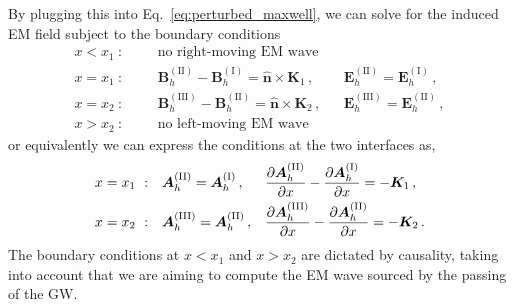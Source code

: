 \documentclass[a4paper,11pt]{article}
\begin{document}
By plugging this into Eq.~\eqref{eq:perturbed_maxwell}, we can solve for the induced EM field subject to the boundary conditions
%
\begin{equation}
    \begin{aligned}
   x < x_1 ~ : && & \text{no right-moving EM wave}   \\
   x= x_1 ~ :  && & {\bm B}_{h}^{(\text{II})} - {\bm B}_{h}^{(\text{I})} =  \hat{\bm{n}} \times {\bm K}_{1}    \, ,
&&
    {\bm E}_{h}^{(\text{II})} =  {\bm E}_{h}^{(\text{I})} \, ,  \\
 x= x_2 ~ :   &&  & {\bm B}_{h}^{(\text{III})} - {\bm B}_{h}^{(\text{II})} = \hat{\bm{n}} \times {\bm K}_{2}
 \, , &&
     {\bm E}_{h}^{(\text{III})} =  {\bm E}_{h}^{(\text{II})} \, ,   \\
      x > x_2 ~ : && & \text{no left-moving EM wave}
    \label{eq:boundary2}
\end{aligned}
\end{equation}
%
or equivalently we can express the conditions at the two interfaces as,
%
\begin{equation}
\begin{aligned}
   x=x_1 ~ : &&  & {\bm A}_{h}^{\rm (II)}   =  {\bm A}_{h}^{\rm (I)}  \,,  && 
   \frac{ \partial {\bm A}_{h}^{(\text{II})}}{\partial x} - \frac{\partial {\bm A}_{h}^{(\text{I})}}{\partial x} = - {\bm K}_{1} \,,
  \\
  x=x_2 ~ : &&  & {\bm A}_{h}^{\rm (III)}   = {\bm A}_{h}^{\rm (II)}   \,,
    &&
    \frac{ \partial {\bm A}_{h}^{{(\text{III})}}}{\partial x} - \frac{\partial {\bm A}_{h}^{(\text{II})}}{\partial x} = - {\bm K}_{2} \,.
    \label{eq:boundary3}
\end{aligned}
\end{equation}
%
The boundary conditions at $x < x_1$ and $x > x_2$ are dictated by causality, taking into account that we are aiming to compute the EM wave sourced by the passing of the GW.
\end{document}
